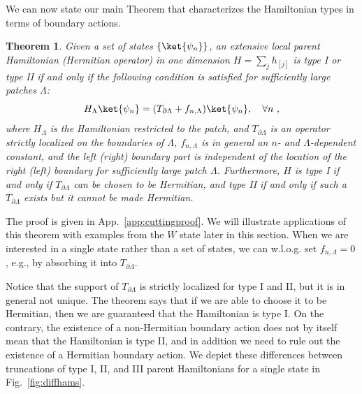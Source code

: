 \documentclass[prx,letterpaper,aps,superscriptaddress,floatfix,twocolumn,nofootinbib]{revtex4-2}
\newtheorem{thm}{Theorem}
\theoremstyle{definition}
\begin{document}
%
We can now state our main Theorem that characterizes the Hamiltonian types in terms of boundary actions.
%
\begin{thm}
\label{thm:Hermitiancut}
%
Given a set of states $\{\ket{\psi_n}\}$, an extensive local parent Hamiltonian (Hermitian operator) in one dimension $H = \sum_j{h_{[j]}}$ is type I or type II if and only if the following condition is satisfied for sufficiently large patches $\Lambda$:
\begin{equation}
H_\Lambda\ket{\psi_n} = (T_{\partial \Lambda} +f_{n, \Lambda})\ket{\psi_n}, \quad \forall n ~,
\label{eq:hermitianrelation}
\end{equation}
where $H_\Lambda$ is the Hamiltonian restricted to the patch, and $T_{\partial \Lambda}$ is an operator strictly localized on the boundaries of $\Lambda$, $f_{n, \Lambda}$ is in general an $n$- and $\Lambda$-dependent constant, and the left (right) boundary part is independent of the location of the right (left) boundary for sufficiently large patch $\Lambda$.
%
Furthermore, $H$ is type I if and only if $T_{\partial \Lambda}$ can be chosen to be Hermitian, and type II if and only if such a $T_{\partial \Lambda}$ exists but it cannot be made Hermitian.
%
\end{thm}
%
The proof is given in App.~\ref{app:cuttingproof}.
%
We will illustrate applications of this theorem with examples from the $W$ state later in this section.
%
When we are interested in a single state rather than a set of states, we can w.l.o.g. set $f_{n, \Lambda} = 0$, e.g., by absorbing it into $T_{\partial \Lambda}$.
%

%
Notice that the support of $T_{\partial \Lambda}$ is strictly localized for type I and II, but it is in general not unique.
%
The theorem says that if we are able to choose it to be Hermitian, then we are guaranteed that the Hamiltonian is type I. 
%
On the contrary, the existence of a non-Hermitian boundary action does not by itself mean that the Hamiltonian is type II, and in addition we need to rule out the existence of a Hermitian boundary action.
%
We depict these differences between truncations of type I, II, and III parent Hamiltonians for a single state in Fig.~\ref{fig:diffhams}.
%
\end{document}
